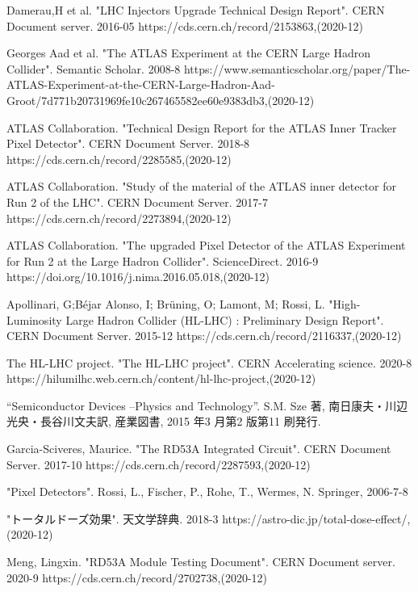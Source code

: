 \begin{thebibliography}{9}

Damerau,H et al. "LHC Injectors Upgrade Technical Design Report". CERN Document server. 2016-05
https://cds.cern.ch/record/2153863,(2020-12)

Georges Aad et al. "The ATLAS Experiment at the CERN Large Hadron Collider". Semantic Scholar. 2008-8
https://www.semanticscholar.org/paper/The-ATLAS-Experiment-at-the-CERN-Large-Hadron-Aad-Groot/7d771b20731969fe10c267465582ee60e9383db3,(2020-12)

ATLAS Collaboration. "Technical Design Report for the ATLAS Inner Tracker Pixel Detector". CERN Document Server. 2018-8
https://cds.cern.ch/record/2285585,(2020-12)

ATLAS Collaboration. "Study of the material of the ATLAS inner detector for Run 2 of the LHC". CERN Document Server. 2017-7
https://cds.cern.ch/record/2273894,(2020-12)

ATLAS Collaboration. "The upgraded Pixel Detector of the ATLAS Experiment for Run 2 at the Large Hadron Collider". ScienceDirect. 2016-9
https://doi.org/10.1016/j.nima.2016.05.018,(2020-12)

Apollinari, G;Béjar Alonso, I; Brüning, O; Lamont, M; Rossi, L. "High-Luminosity Large Hadron Collider (HL-LHC) : Preliminary Design Report". CERN Document Server. 2015-12
https://cds.cern.ch/record/2116337,(2020-12)

The HL-LHC project. "The HL-LHC project". CERN Accelerating science. 2020-8
https://hilumilhc.web.cern.ch/content/hl-lhc-project,(2020-12)

“Semiconductor Devices –Physics and Technology”.
S.M. Sze 著, 南日康夫・川辺光央・長谷川文夫訳, 産業図書, 2015 年3 月第2 版第11 刷発行.

Garcia-Sciveres, Maurice. "The RD53A Integrated Circuit". CERN Document Server. 2017-10
https://cds.cern.ch/record/2287593,(2020-12)

"Pixel Detectors". 
Rossi, L., Fischer, P., Rohe, T., Wermes, N. Springer, 2006-7-8

"トータルドーズ効果". 天文学辞典. 2018-3
https://astro-dic.jp/total-dose-effect/,(2020-12)

Meng, Lingxin. "RD53A Module Testing Document". CERN Document server. 2020-9
https://cds.cern.ch/record/2702738,(2020-12)


\end{thebibliography}
